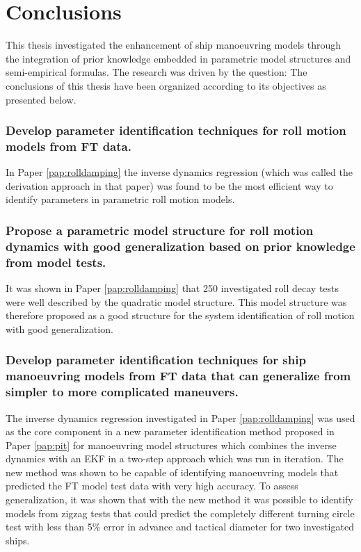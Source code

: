 \chapter{Conclusions\label{ch:conclusions}}

\noindent This thesis investigated the enhancement of ship manoeuvring models through the integration of prior knowledge embedded in parametric model structures and semi-empirical formulas. The research was driven by the question:
The conclusions of this thesis have been organized according to its objectives as presented below.

\subsection*{Develop parameter identification techniques for roll motion models from FT data.}
In Paper \ref{pap:rolldamping}  the inverse dynamics regression (which was called the derivation approach in that paper) was found to be the most efficient way to identify parameters in parametric roll motion models. 

\subsection*{Propose a parametric model structure for roll motion dynamics with good generalization based on prior knowledge from model tests.}
It was shown in Paper \ref{pap:rolldamping} that 250 investigated roll decay tests were well described by the quadratic model structure. This model structure was therefore proposed as a good structure for the system identification of roll motion with good generalization.  

\subsection*{Develop parameter identification techniques for ship manoeuvring models from FT data that can generalize from simpler to more complicated maneuvers.}
The inverse dynamics regression investigated in Paper \ref{pap:rolldamping} was used as the core component in a new parameter identification method proposed in Paper \ref{pap:pit} for manoeuvring model structures which combines the inverse dynamics with an EKF in a two-step approach \cite{yoonIdentificationHydrodynamicCoefficients2003} which was run in iteration.
The new method was shown to be capable of identifying manoeuvring models that predicted the FT model test data with very high accuracy.
To assess generalization, it was shown that with the new method it was possible to identify models from zigzag tests that could predict the completely different turning circle test with less than 5\% error in advance and tactical diameter for two investigated ships.

